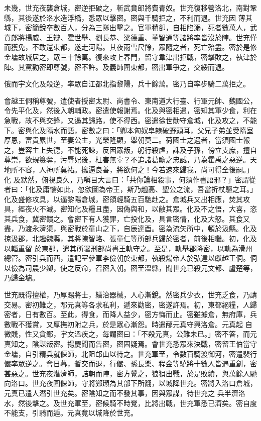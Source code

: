 \begin{pinyinscope}
 未幾，世充夜襲倉城，密逆拒破之，斬武賁郎將費青奴。世充復移營洛北，南對鞏縣，其後遂於洛水造浮橋，悉眾以擊密。密與千騎拒之，不利而退。世充因
 薄其城下，密簡銳卒數百人，分為三隊出擊之。官軍稍卻，自相陷溺，死者數萬人，武賁郎將楊威、王辯、霍世舉、劉長恭、梁德重、董智通等諸將率皆沒於陣。世充僅而獲免，不敢還東都，遂走河陽。其夜雨雪尺餘，眾隨之者，死亡殆盡。密於是修金墉故城居之，眾三十餘萬。復來攻上春門，留守韋津出拒戰，密擊敗之，執津於陣。其黨勸密即尊號，密不許。及義師圍東都，密出軍爭之，交綏而退。



 俄而宇文化及殺逆，率眾自江都北指黎陽，兵十餘萬。密乃自率步騎二萬拒之。



 會越王侗稱尊號，遣使者授密太尉、尚書令、東南道大行臺、行軍元帥、魏國公，
 令先平化及，然後入朝輔政。密遣使報謝焉。化及與密相遇，密知其軍少食，利在急戰，故不與交鋒，又遏其歸路，使不得西。密遣徐世勣守倉城，化及攻之，不能下。密與化及隔水而語，密數之曰：「卿本匈奴皁隸破野頭耳，父兄子弟並受隋室厚恩，富貴累世，至妻公主，光榮隆顯，舉朝莫二。荷國士之遇者，當須國士報之，豈容主上失德，不能死諫，反因眾叛，躬行殺虐，誅及子孫，傍立支庶，擅自尊崇，欲規篡奪，污辱妃後，枉害無辜？不追諸葛瞻之忠誠，乃為霍禹之惡逆。天地所不容，人神所莫祐。擁逼良善，將欲何之！今若速來歸我，尚可得全後嗣。」化
 及默然，俯視良久，乃嗔目大言曰：「共你論相殺事，何須作書語邪？」密謂從者曰：「化及庸懦如此，忽欲圖為帝王，斯乃趙高、聖公之流，吾當折杖驅之耳。」化及盛修攻具，以逼黎陽倉城，密領輕騎五百馳赴之。倉城兵又出相應，焚其攻具，經夜火不滅。密知化及糧且盡，因偽與和，以敝其眾。化及不之悟，大喜，恣其兵食，冀密饋之。會密下有人獲罪，亡投化及，具言密情，化及大怒。其食又盡，乃渡永濟渠，與密戰於童山之下，自辰達酉。密為流矢所中，頓於汲縣。化及掠汲郡，北趣魏縣，其將陳智略、張童仁等所部兵歸於密者，前後相繼。初，化及以輜重留
 於東郡，遣其所署刑部尚書王軌守之。至是，軌舉郡降密，以軌為滑州總管。密引兵而西，遣記室參軍李儉朝於東都，執殺煬帝人於弘達以獻越王侗。侗以儉為司農少卿，使之反命，召密入朝。密至溫縣，聞世充已殺元文都、盧楚等，乃歸金墉。



 世充既得擅權，乃厚賜將士，繕治器械，人心漸銳。然密兵少衣，世充乏食，乃請交易。密初難之，邴元真等各求私利，遞來勸密，密遂許焉。初，東都絕糧，人歸密者，日有數百。至此，得食，而降人益少，密方悔而止。密雖據倉，無府庫，兵數戰不獲賞，又厚撫初附之兵，於是眾心漸怨。時遣邴元真守興洛倉。元真起
 自微賤，性又貪鄙，宇文溫疾之，每謂密曰：「不殺元真，公難未已。」密不答，而元真知之，陰謀叛密。揚慶聞而告密，密固疑焉。會世充悉眾來決戰，密留王伯當守金墉，自引精兵就偃師，北阻邙山以待之。世充軍至，令數百騎渡御河，密遣裴行儼率眾逆之。會日暮，暫交而退，行儼、孫長樂、程金等驍將十數人皆遇重創，密甚惡之。世充夜潛濟師，詰朝而陣，密方覺之，狼狽出戰，於是敗績，與萬餘人馳向洛口。世充夜圍偃師，守將鄭頲為其部下所翻，以城降世充。密將入洛口倉城，元真已遣人潛引世充矣。密陰知之而不發其事，因與眾謀，待世充之
 兵半濟洛水，然後擊之。及世充軍至，密候騎不時覺，比將出戰，世充軍悉已濟矣。密自度不能支，引騎而遁。元真竟以城降於世充。




\end{pinyinscope}

